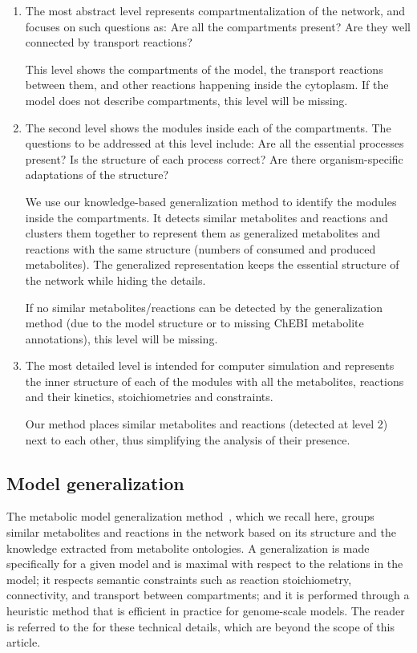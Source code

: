 \documentclass{bmcart}
\begin{document}
\begin{enumerate}
\item The most abstract level represents compartmentalization of the network, and focuses on such questions as: Are all the compartments present? Are they well connected by transport reactions?

This level shows the compartments of the model, the transport reactions between them, and other reactions happening inside the cytoplasm.
If the model does not describe compartments, this level will be missing.

\item The second level shows the modules inside each of the compartments. The questions to be addressed at this level include: Are all the essential processes present? Is the structure of each process correct? Are there organism-specific adaptations of the structure?

We use our knowledge-based generalization method to identify the modules inside the compartments. It detects similar metabolites and reactions and clusters them together to represent them as generalized metabolites and reactions with the same structure (numbers of consumed and produced metabolites). The generalized representation keeps the essential structure of the network while hiding the details.

If no similar metabolites/reactions can be detected by the generalization method (due to the model structure or to missing ChEBI metabolite annotations), this level will be missing.

\item The most detailed level is intended for computer simulation and represents the inner structure of each of the modules with all the metabolites, reactions and their kinetics, stoichiometries and constraints.

Our method places similar metabolites and reactions (detected at level 2) next to each other, thus simplifying the analysis of their presence.

\end{enumerate}

\subsection*{Model generalization}
The metabolic model generalization method~\cite{Zhukova2014}, which we recall here, groups similar metabolites and reactions in the network based on its structure and the knowledge extracted from metabolite ontologies. 
A generalization is made specifically for a given model and is maximal with respect to the
relations in the model; it respects semantic constraints such as reaction stoichiometry,
connectivity, and transport between compartments; and it is performed through a heuristic
method that is efficient in practice for genome-scale models. The reader is referred to
the \cite{Zhukova2014} for these technical details, which are beyond the scope of this article.
\end{document}
